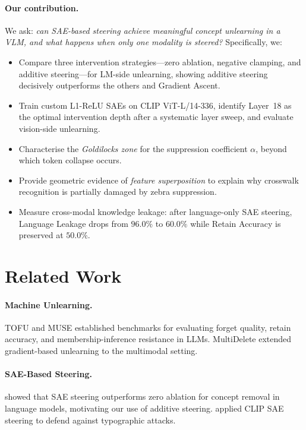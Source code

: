 \documentclass{article}
\begin{document}
\paragraph{Our contribution.}
We ask: \emph{can SAE-based steering achieve meaningful concept
unlearning in a VLM, and what happens when only one modality is
steered?} Specifically, we:
\begin{itemize}\setlength\itemsep{2pt}
  \item Compare three intervention strategies---zero ablation, negative
        clamping, and additive steering---for LM-side unlearning,
        showing additive steering decisively outperforms the others and
        Gradient Ascent.
  \item Train custom L1-ReLU SAEs on CLIP ViT-L/14-336, identify
        Layer~18 as the optimal intervention depth after a systematic
        layer sweep, and evaluate vision-side unlearning.
  \item Characterise the \emph{Goldilocks zone} for the suppression
        coefficient $\alpha$, beyond which token collapse occurs.
  \item Provide geometric evidence of \emph{feature superposition} to
        explain why crosswalk recognition is partially damaged by zebra
        suppression.
  \item Measure cross-modal knowledge leakage: after language-only SAE
        steering, Language Leakage drops from $96.0\%$ to $60.0\%$
        while Retain Accuracy is preserved at $50.0\%$.
\end{itemize}

\section{Related Work}
\label{sec:related}

\paragraph{Machine Unlearning.}
TOFU \citep{maini2024tofu} and MUSE \citep{shi2024muse} established
benchmarks for evaluating forget quality, retain accuracy, and
membership-inference resistance in LLMs. MultiDelete
\citep{multidelete2024} extended gradient-based unlearning to the
multimodal setting.

\paragraph{SAE-Based Steering.}
\citet{farrell2024saesunlearning} showed that SAE steering outperforms
zero ablation for concept removal in language models, motivating our
use of additive steering. \citet{joseph2025clipsteer} applied CLIP SAE
steering to defend against typographic attacks.
\end{document}
